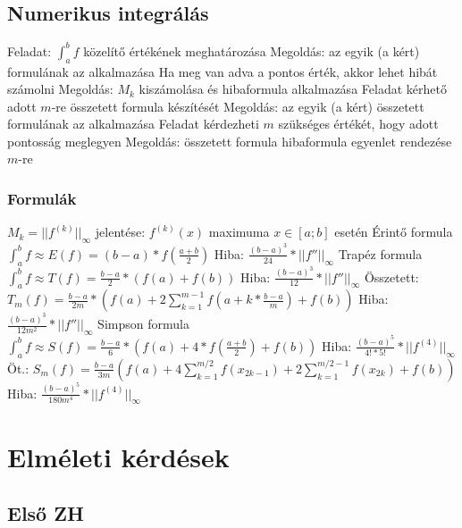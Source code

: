 \documentclass[12pt,a4paper]{article}
\begin{document}
\pagebreak

\subsection{Numerikus integrálás}

\begin{outline}
	\1 Feladat: $\int_a^b f$ közelítő értékének meghatározása
		\2 Megoldás: az egyik (a kért) formulának az alkalmazása
	\1 Ha meg van adva a pontos érték, akkor lehet hibát számolni
		\2 Megoldás: $M_k$ kiszámolása és hibaformula alkalmazása
	\1 Feladat kérhető adott $m$-re összetett formula készítését
		\2 Megoldás: az egyik (a kért) összetett formulának az alkalmazása
	\1 Feladat kérdezheti $m$ szükséges értékét, hogy adott pontosság meglegyen
		\2 Megoldás: összetett formula hibaformula egyenlet rendezése $m$-re
\end{outline}

\subsubsection{Formulák}

\begin{outline}
	\1 $M_k = ||f^{(k)}||_\infty$ jelentése: $f^{(k)}(x)$ maximuma $x \in [a;b]$ esetén
	\1 Érintő formula
		\2 $\int_a^b f \approx E(f) = (b-a) *f(\frac{a+b}{2})$
		\2 Hiba: $\frac{(b-a)^3}{24} * ||f''||_\infty$
	\1 Trapéz formula
		\2 $\int_a^b f \approx T(f) = \frac{b-a}{2} * (f(a) + f(b))$
			\3 Hiba: $\frac{(b-a)^3}{12} * ||f''||_\infty$
		\2 Összetett: $T_m(f) = \frac{b-a}{2m} * (f(a) + 2\sum_{k=1}^{m-1} f(a+k*\frac{b-a}{m}) + f(b))$
			\3 Hiba: $\frac{(b-a)^3}{12m^2} * ||f''||_\infty$
	\1 Simpson formula
		\2 $\int_a^b f \approx S(f) = \frac{b-a}{6} * (f(a) + 4 * f(\frac{a+b}{2}) + f(b))$
			\3 Hiba: $\frac{(b-a)^5}{4! * 5!} *||f^{(4)}||_\infty$
		\2 Öt.: $S_m(f) = \frac{b-a}{3m} (f(a) + 4 \sum_{k=1}^{m/2} f(x_{2k-1}) + 2 \sum_{k=1}^{m/2-1} f(x_{2k}) + f(b))$
			\3 Hiba: $\frac{(b-a)^5}{180m^4} *||f^{(4)}||_\infty$
\end{outline}

\pagebreak

\section{Elméleti kérdések}

\subsection{Első ZH}
\end{document}
